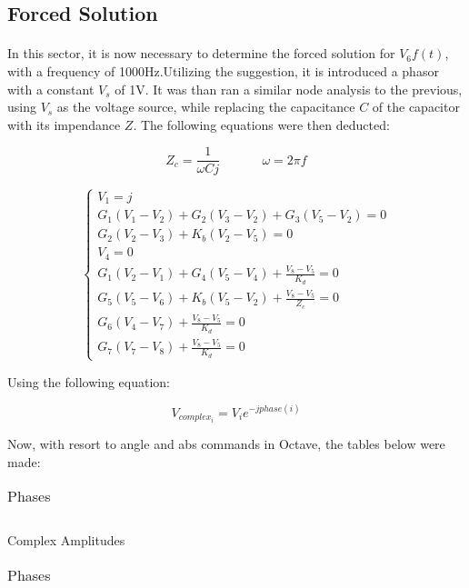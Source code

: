\subsection{Forced Solution}
\paragraph{}

\par In this sector, it is now necessary to determine the forced solution for $V_{6}f(t)$, with a frequency of 1000Hz.Utilizing the suggestion, it is introduced a phasor with a constant $V_s$ of 1V.
It was than ran a similar node analysis to the previous, using $V_s$ as the voltage source, while replacing the capacitance $C$ of the capacitor with its impendance $Z$. The following equations were then deducted: 

\begin{equation}
	Z_c = \frac{1}{\omega C j}     \ \ \  \ \ \ \ \  \ \ \ \ \ \ \ \omega = 2 \pi f
\end{equation}


$$
\begin{cases} 
	V_1 = j \\ 
	G_1 (V_1-V_2) + G_2 (V_3-V_2) + G_3 (V_5-V_2) = 0 \\
	G_2 (V_2-V_3) + K_b (V_2-V_5) = 0 \\
	V_4 = 0 \\
	G_1 (V_2-V_1) + G_4 (V_5-V_4) + \frac{V_8-V_5}{K_d} = 0 \\ 
	G_5 (V_5-V_6) + K_b (V_5-V_2) + \frac{V_8-V_5}{Z_c} = 0 \\
	G_6 (V_4-V_7) + \frac{V_8-V_5}{K_d} = 0 \\ 
	G_7 (V_7-V_8) + \frac{V_8-V_5}{K_d} = 0 
\label{system 4}
\end{cases}
$$
\par Using the following equation:

\begin{equation}
	V_{complex_i} = V_i e^{-j phase(i)}
\end{equation}

\par Now, with resort to angle and abs commands in Octave, the tables below were made:

\begin{table}[H]
    \begin{minipage}{.5\linewidth}
      \centering
        \begin{tabular}{|c|c|}
    	\hline
        	
        \end{tabular}
        \caption{Complex Amplitudes}
        \label{table4a}
    \end{minipage}%
    \begin{minipage}{.5\linewidth}
      \centering
        \begin{tabular}{|c|c|}
   	\hline
        	
        \end{tabular}
        \caption{Phases}
        \label{table4b}
    \end{minipage} 
\end{table}

